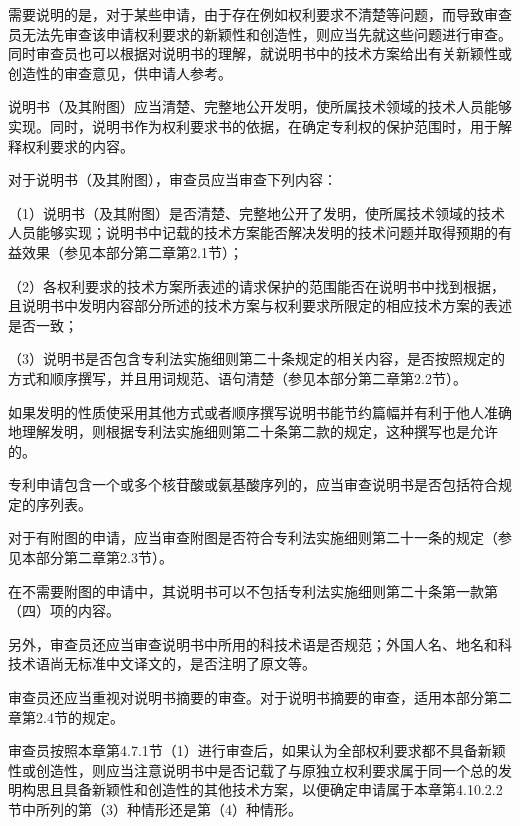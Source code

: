 需要说明的是，对于某些申请，由于存在例如权利要求不清楚等问题，而导致审查员无法先审查该申请权利要求的新颖性和创造性，则应当先就这些问题进行审查。同时审查员也可以根据对说明书的理解，就说明书中的技术方案给出有关新颖性或创造性的审查意见，供申请人参考。

说明书（及其附图）应当清楚、完整地公开发明，使所属技术领域的技术人员能够实现。同时，说明书作为权利要求书的依据，在确定专利权的保护范围时，用于解释权利要求的内容。

对于说明书（及其附图），审查员应当审查下列内容：

{\setlength{\parindent}{17.1bp}（1）说明书（及其附图）是否清楚、完整地公开了发明，使所属技术领域的技术人员能够实现；说明书中记载的技术方案能否解决发明的技术问题并取得预期的有益效果（参见本部分第二章第2.1节）；\par}

{\setlength{\parindent}{17.1bp}（2）各权利要求的技术方案所表述的请求保护的范围能否在说明书中找到根据，且说明书中发明内容部分所述的技术方案与权利要求所限定的相应技术方案的表述是否一致；\par}

{\setlength{\parindent}{17.1bp}（3）说明书是否包含专利法实施细则第二十条规定的相关内容，是否按照规定的方式和顺序撰写，并且用词规范、语句清楚（参见本部分第二章第2.2节）。\par}

如果发明的性质使采用其他方式或者顺序撰写说明书能节约篇幅并有利于他人准确地理解发明，则根据专利法实施细则第二十条第二款的规定，这种撰写也是允许的。

专利申请包含一个或多个核苷酸或氨基酸序列的，应当审查说明书是否包括符合规定的序列表。

对于有附图的申请，应当审查附图是否符合专利法实施细则第二十一条的规定（参见本部分第二章第2.3节）。

在不需要附图的申请中，其说明书可以不包括专利法实施细则第二十条第一款第（四）项的内容。

另外，审查员还应当审查说明书中所用的科技术语是否规范；外国人名、地名和科技术语尚无标准中文译文的，是否注明了原文等。

审查员还应当重视对说明书摘要的审查。对于说明书摘要的审查，适用本部分第二章第2.4节的规定。

审查员按照本章第4.7.1节（1）进行审查后，如果认为全部权利要求都不具备新颖性或创造性，则应当注意说明书中是否记载了与原独立权利要求属于同一个总的发明构思且具备新颖性和创造性的其他技术方案，以便确定申请属于本章第4.10.2.2节中所列的第（3）种情形还是第（4）种情形。

